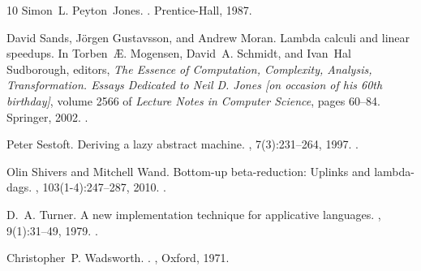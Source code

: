 \documentclass[10pt,a4paper]{article}
\theoremstyle{remark}
\begin{document}
\begin{thebibliography}{10}
Simon~L. Peyton~Jones.
.
\newblock Prentice-Hall, 1987.

David Sands, J{\"{o}}rgen Gustavsson, and Andrew Moran.
\newblock Lambda calculi and linear speedups.
\newblock In Torben~{\AE}. Mogensen, David~A. Schmidt, and Ivan~Hal Sudborough,
  editors, {\em The Essence of Computation, Complexity, Analysis,
  Transformation. Essays Dedicated to Neil D. Jones [on occasion of his 60th
  birthday]}, volume 2566 of {\em Lecture Notes in Computer Science}, pages
  60--84. Springer, 2002.
\newblock \href {https://doi.org/10.1007/3-540-36377-7\_4}
  {}.

Peter Sestoft.
\newblock Deriving a lazy abstract machine.
, 7(3):231--264, 1997.
\newblock \href {https://doi.org/10.1017/S0956796897002712}
  {}.

Olin Shivers and Mitchell Wand.
\newblock Bottom-up beta-reduction: Uplinks and lambda-dags.
, 103(1-4):247--287, 2010.
\newblock \href {https://doi.org/10.3233/FI-2010-328}
  {}.

D.~A. Turner.
\newblock A new implementation technique for applicative languages.
, 9(1):31--49, 1979.
\newblock \href {https://doi.org/10.1002/SPE.4380090105}
  {}.

Christopher~P. Wadsworth.
.
, Oxford, 1971.

\end{thebibliography}
\end{document}
